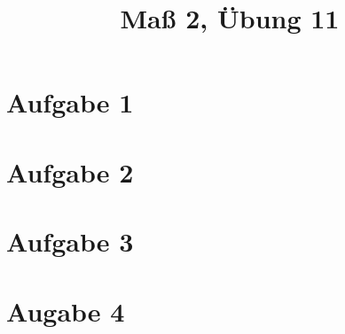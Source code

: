 \documentclass[]{article}
\author{}
\title{Maß 2, Übung 11}
\begin{document}
    \begin{titlepage}
        \maketitle
    \end{titlepage}
    
    \section{Aufgabe 1}
    
    \section{Aufgabe 2}
    
    \section{Aufgabe 3}
    
    \section{Augabe 4}
    
    
    
    
\end{document}
